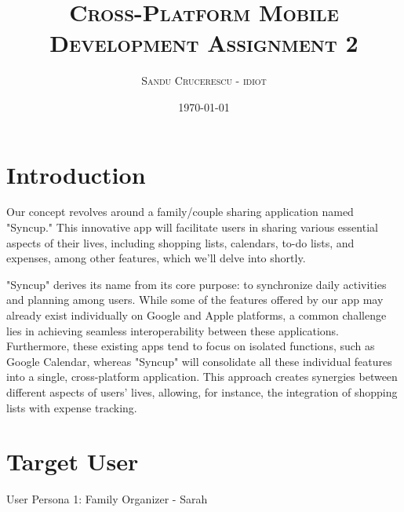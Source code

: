 \documentclass[12pt]{article}
\begin{document}
\title{\textsc{Cross-Platform Mobile Development \linebreak  \large{Assignment 2} }}
\author{\textsc{Sandu Crucerescu - idiot}}
\date{\textsc{\today}}

\maketitle
\pagebreak

\tableofcontents
\pagebreak

\section{Introduction}

Our concept revolves around a family/couple sharing application named "Syncup." 
This innovative app will facilitate users in sharing various essential aspects of their lives,
 including shopping lists, calendars, to-do lists, and expenses, among other features, which we'll delve into shortly.

"Syncup" derives its name from its core purpose: to synchronize daily activities and planning 
among users. While some of the features offered by our app may already exist individually 
on Google and Apple platforms, a common challenge lies in achieving seamless interoperability 
between these applications. Furthermore, these existing apps tend to focus on isolated functions, 
such as Google Calendar, whereas "Syncup" will consolidate all these individual features into a single,
 cross-platform application. This approach creates synergies between different aspects of users' lives, 
 allowing, for instance, the integration of shopping lists with expense tracking.

\section{Target User}

User Persona 1: Family Organizer - Sarah
\end{document}
